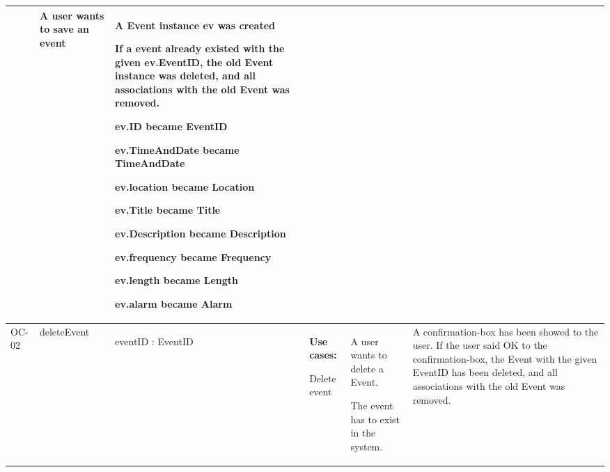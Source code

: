 \begin{sidewaystable}[ht]
\begin{tabular}{|l|l|P{90px}|P{100px}|P{80px}|P{150px}|}
		&
			A user wants to save an event
		&
			\begin{my_itemize}
				\item A Event instance ev was created
				\item If a event already existed with the given ev.EventID, the old Event instance was deleted, and all associations with the old Event was removed.
				\item ev.ID became EventID
				\item ev.TimeAndDate became TimeAndDate
				\item ev.location became Location       
				\item ev.Title became Title
				\item ev.Description became Description
				\item ev.frequency became Frequency        
				\item ev.length became Length
				\item ev.alarm became Alarm 
			\end{my_itemize}
        \\ \hline        
        OC-02 & deleteEvent 
        &
        	\begin{my_itemize}
        	\item eventID : EventID
        	\end{my_itemize}
        &
		\textbf{Use cases:}
		\begin{my_itemize}
			\item[]
			\item Delete event
		\end{my_itemize}
        &
        \begin{my_itemize}
			\item A user wants to delete a Event.
     		\item The event has to exist in the system.
		\end{my_itemize}        
        &
        A confirmation-box has been showed to the user.
        If the user said OK to the confirmation-box, the Event with the given EventID has been deleted, and all associations with the old Event was removed.
        \\ \hline
    \end{tabular}
\end{sidewaystable}


